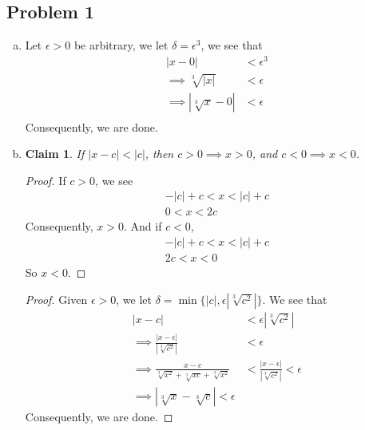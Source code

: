 \documentclass[12pt]{article}
\newtheorem*{claim}{Claim}
\begin{document}
\subsection*{Problem 1}
\begin{enumerate}[a).]
    \item {
        Let $\epsilon > 0$ be arbitrary, we let $\delta = \epsilon^3$, we see that 
        \begin{align*}
            |x - 0| &< \epsilon^3\\
            \implies \sqrt[3]{|x|} &< \epsilon\\
            \implies |\sqrt[3]{x} - 0| &< \epsilon\\
        \end{align*}
        Consequently, we are done. 
    }
    \item {
        \begin{claim}
            If $|x-c|<|c|$, then $c >0 \implies x>0$, and $c<0 \implies x < 0$.
        \end{claim}
        \begin{proof}
            If $c > 0$, we see 
            \begin{align*}
                -|c| + c < x < |c| + c \\
                0 < x < 2c
            \end{align*}
            Consequently, $x>0$. And if $c < 0$,
            \begin{align*}
                -|c| + c < x < |c| + c \\
                2c < x < 0
            \end{align*}
            So $x < 0$.
        \end{proof}

        \begin{proof}
            Given $\epsilon > 0$, we let $\delta = \min\{ |c|, \epsilon|\sqrt[3]{c^2}|\}$.
            We see that 
            \begin{align*}
                |x - c| &< \epsilon|\sqrt[3]{c^2}| \\
                \implies \frac{|x - \epsilon|}{|\sqrt[3]{c^2}|} &< \epsilon\\
                \implies \frac{x - c}{\sqrt[3]{x^2} + \sqrt[3]{xc} + \sqrt[3]{x^2}} &< \frac{|x - \epsilon|}{|\sqrt[3]{c^2}|} < \epsilon \\
                \implies |\sqrt[3]{x} - \sqrt[3]{c}| < \epsilon
            \end{align*}
            Consequently, we are done. 
        \end{proof}
    }
\end{enumerate}
\end{document}
